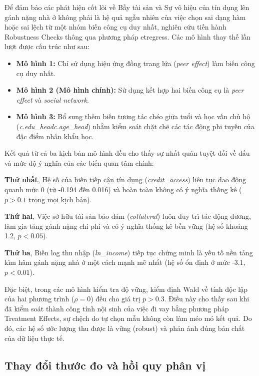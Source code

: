 \documentclass[12pt,a4paper]{report}
\begin{document}
Để đảm bảo các phát hiện cốt lõi về Bẫy tài sản và Sự vô hiệu của tín dụng lên gánh nặng nhà ở không phải là hệ quả ngẫu nhiên của việc chọn sai dạng hàm hoặc sai lệch từ một nhóm biến công cụ duy nhất, nghiên cứu tiến hành Robustness Checks thông qua phương pháp etregress. Các mô hình thay thế lần lượt được cấu trúc như sau:

\begin{itemize}
	\item \textbf{Mô hình 1:} Chỉ sử dụng hiệu ứng đồng trang lứa (\textit{peer effect}) làm biến công cụ duy nhất.
	\item \textbf{Mô hình 2 (Mô hình chính):} Sử dụng kết hợp hai biến công cụ là \textit{peer effect} và \textit{social network}.
	\item \textbf{Mô hình 3:} Bổ sung thêm biến tương tác chéo giữa tuổi và học vấn chủ hộ (\textit{c.edu\_head\*c.age\_head}) nhằm kiểm soát chặt chẽ các tác động phi tuyến của đặc điểm nhân khẩu học.
\end{itemize}

Kết quả từ cả ba kịch bản mô hình đều cho thấy sự nhất quán tuyệt đối về dấu và mức độ ý nghĩa của các biến quan tâm chính:

\textbf{Thứ nhất}, Hệ số của biến tiếp cận tín dụng (\textit{credit\_access}) liên tục dao động quanh mức 0 (từ -0.194 đến 0.016) và hoàn toàn không có ý nghĩa thống kê ($p>0.1$ trong mọi kịch bản). 

\textbf{Thứ hai}, Việc sở hữu tài sản bảo đảm (\textit{collateral}) luôn duy trì tác động dương, làm gia tăng gánh nặng chi phí và có ý nghĩa thống kê bền vững (hệ số khoảng 1.2, $p<0.05$).

\textbf{Thứ ba}, Biến log thu nhập (\textit{ln\_income}) tiếp tục chứng minh là yếu tố nền tảng kìm hãm gánh nặng nhà ở một cách mạnh mẽ nhất (hệ số ổn định ở mức -3.1, $p<0.01$).

Đặc biệt, trong các mô hình kiểm tra độ vững, kiểm định Wald về tính độc lập của hai phương trình ($\rho=0$) đều cho giá trị $p>0.3$. Điều này cho thấy sau khi đã kiểm soát thành công tính nội sinh của việc đi vay bằng phương pháp Treatment Effects, sự chệch do tự chọn mẫu không còn làm méo mó kết quả. Do đó, các hệ số ước lượng thu được là vững (robust) và phản ánh đúng bản chất của dữ liệu thực tế.

\subsection{Thay đổi thước đo và hồi quy phân vị}
\end{document}
